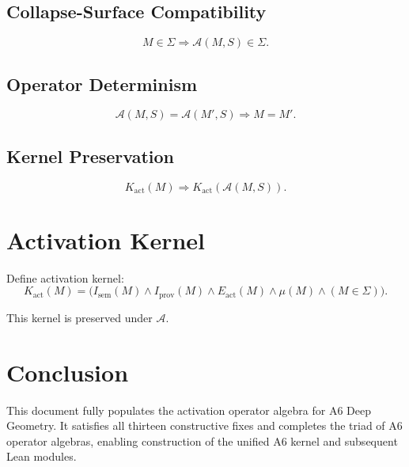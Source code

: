 \documentclass[11pt]{article}
\begin{document}
\subsection{Collapse-Surface Compatibility}
\[
M \in \Sigma \Rightarrow \mathcal{A}(M, S) \in \Sigma.
\]

\subsection{Operator Determinism}
\[
\mathcal{A}(M, S) = \mathcal{A}(M', S) \Rightarrow M = M'.
\]

\subsection{Kernel Preservation}
\[
K_{\mathrm{act}}(M) \Rightarrow K_{\mathrm{act}}(\mathcal{A}(M, S)).
\]

\section{Activation Kernel}

Define activation kernel:
\[
K_{\mathrm{act}}(M) =
  \big(
    I_{\mathrm{sem}}(M)
    \land I_{\mathrm{prov}}(M)
    \land E_{\mathrm{act}}(M)
    \land \mu(M)
    \land (M \in \Sigma)
  \big).
\]

This kernel is preserved under $\mathcal{A}$.

\section{Conclusion}

This document fully populates the activation operator algebra for A6 Deep
Geometry. It satisfies all thirteen constructive fixes and completes the triad
of A6 operator algebras, enabling construction of the unified A6 kernel and
subsequent Lean modules.
\end{document}
